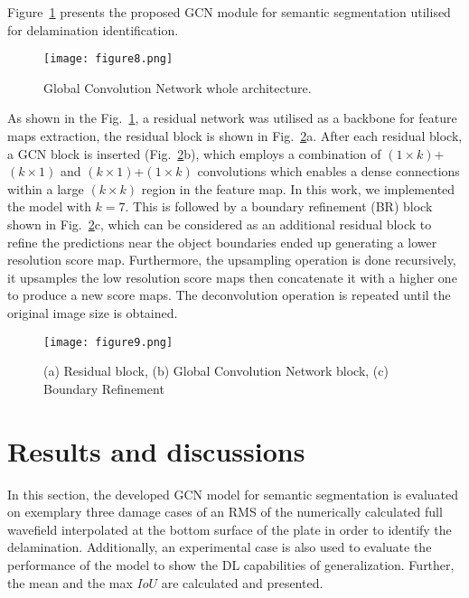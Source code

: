 \documentclass[runningheads]{llncs}
\begin{document}
Figure~\ref{fig:gcn} presents the proposed GCN module for semantic segmentation 
utilised for delamination identification.
\begin{figure} [h!]
	\begin{center}
		\texttt{[image: figure8.png]}
	\end{center}
	\caption{Global Convolution Network whole architecture.} 
	\label{fig:gcn}
\end{figure}
As shown in the Fig.~\ref{fig:gcn}, a residual network was utilised as a backbone for 
feature maps extraction, the residual block is shown in 
Fig.~\ref{fig:res_gcn_br}a.
After each residual block, a GCN block is inserted  
(Fig.~\ref{fig:res_gcn_br}b), which employs a combination of \((1\times 
k)\)+\((k\times 1)\) and \((k\times 1)\)+\((1\times k)\) convolutions which 
enables a dense connections within a large \((k\times k)\) region in the 
feature map.
In this work, we implemented the model with \(k=7\).
This is followed by a boundary refinement (BR) block shown in Fig.~\ref{fig:res_gcn_br}c, which can be considered as an additional residual block to refine the predictions near the object boundaries ended up generating a lower resolution score map. 
Furthermore, the upsampling operation is done recursively, it upsamples the low 
resolution score maps then concatenate it with a higher one to produce a new 
score maps.
The deconvolution operation is repeated until the original image size is 
obtained.
\begin{figure} [ht!]
	\begin{center}
		\texttt{[image: figure9.png]}
	\end{center}
	\caption{(a) Residual block, (b) Global Convolution Network block, (c) 
		Boundary Refinement} 
	\label{fig:res_gcn_br}
\end{figure}
\section{Results and discussions}
\label{section:results_and_discussions}
In this section, the developed GCN model for semantic segmentation is evaluated on exemplary three damage cases of an RMS of the numerically calculated full wavefield interpolated at the bottom surface of the plate in order to identify the delamination.
Additionally, an experimental case is also used to evaluate the performance of the model to show the DL capabilities of generalization.
Further, the mean and the max \(IoU\) are calculated and presented.
\end{document}
